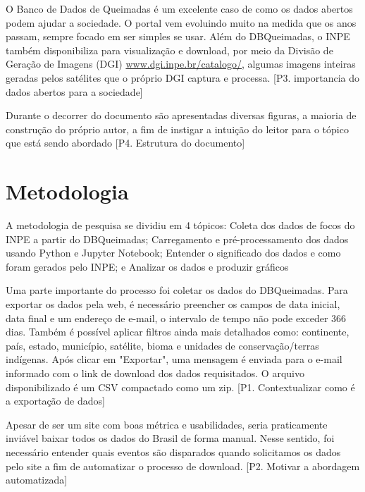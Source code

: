 \documentclass[cic,tc]{iiufrgs}
\begin{document}
O Banco de Dados de Queimadas é um excelente caso de como os dados abertos podem 
ajudar a sociedade. O portal vem evoluindo muito na medida que os anos passam, 
sempre focado em ser simples se usar. Além do DBQueimadas, o INPE também 
disponibiliza para visualização e download, por meio da Divisão de Geração de 
Imagens (DGI) \url{www.dgi.inpe.br/catalogo/}, algumas imagens inteiras geradas 
pelos satélites que o próprio DGI captura e processa. 
[P3. importancia do dados abertos para a sociedade] \par

Durante o decorrer do documento são apresentadas diversas figuras, a maioria de 
construção do próprio autor, a fim de instigar a intuição 
do leitor para o tópico que está sendo abordado [P4. Estrutura do documento] \par



\chapter{Metodologia}

A metodologia de pesquisa se dividiu em 4 tópicos: Coleta dos dados de focos do 
INPE a partir do DBQueimadas; Carregamento e pré-processamento dos dados usando 
Python e Jupyter Notebook; Entender o significado dos dados e como foram gerados 
pelo INPE; e Analizar os dados e produzir gráficos \par



Uma parte importante do processo foi coletar os dados do DBQueimadas. 
Para exportar os dados pela web, é necessário preencher os campos de data inicial,
data final e um endereço de e-mail, o intervalo de tempo não 
pode exceder 366 dias. Também é possível aplicar filtros ainda mais 
detalhados como: continente, país, estado, município, satélite, bioma e 
unidades de conservação/terras indígenas. Após clicar em "Exportar", 
uma mensagem é enviada para o e-mail informado com o link de download 
dos dados requisitados. O arquivo disponibilizado é um CSV compactado 
como um zip. [P1. Contextualizar como é a exportação de dados]\par

Apesar de ser um site com boas métrica e usabilidades, seria praticamente 
inviável baixar todos os dados do Brasil de forma manual. Nesse sentido, 
foi necessário entender quais eventos são disparados quando solicitamos 
os dados pelo site a fim de automatizar o processo de download. 
[P2. Motivar a abordagem automatizada] \par
\end{document}
